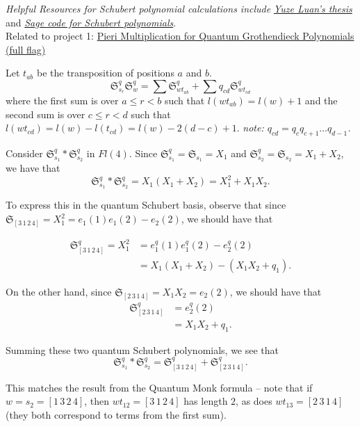 \textit{Helpful Resources for Schubert polynomial calculations include}
\href{https://www.math.ucdavis.edu/~webfiles/undergrad_thesis/202003_Yuze_Luan_Carlsson_Thesis.pdf}{\textit{Yuze Luan's thesis}} and \href{https://doc.sagemath.org/html/en/reference/combinat/sage/combinat/schubert_polynomial.html}{\textit{Sage code for Schubert polynomials}}. \\

Related to project 1: \href{https://arxiv.org/pdf/2211.01578}{Pieri Multiplication for Quantum Grothendieck Polynomials (full flag)} \\

\begin{theorem*}
Let $t_{ab}$ be the transposition of positions $a$ and $b$.
    \[
        \mathfrak{S}_{s_r}^q \mathfrak{S}_{w}^q = \sum \mathfrak{S}_{wt_{ab}}^q + \sum q_{cd}\mathfrak{S}_{wt_{cd}}^q
    \]
    where the first sum is over $a \leq r < b$ such that $l(wt_{ab}) = l(w) + 1$ and the second sum is over $c \leq r < d$ such that $l(wt_{cd}) = l(w) - l(t_{cd}) = l(w) - 2(d - c) + 1$. \textit{note: $q_{cd} = q_c q_{c+1} \dots q_{d-1}$.}
\end{theorem*}


\begin{eg}
Consider $\mathfrak{S}^q_{s_1} \ast \mathfrak{S}^q_{s_2}$ in $Fl(4)$. Since $\mathfrak{S}^q_{s_1} = \mathfrak{S}_{s_1} = X_1$ and $\mathfrak{S}^q_{s_2} = \mathfrak{S}_{s_2} = X_1 + X_2$, we have that
\[
    \mathfrak{S}^q_{s_1} \ast \mathfrak{S}^q_{s_2} = X_1(X_1 + X_2) = X_1^2 + X_1X_2.
\]

To express this in the quantum Schubert basis, observe that since $\mathfrak{S}_{[3\,1\,2\,4]} = X_1^2 = e_1(1)e_1(2) - e_2(2)$, we should have that

\begin{align*}
\mathfrak{S}^q_{[3\,1\,2\,4]} = X_1^2 &= e^q_1(1)e^q_1(2) - e^q_2(2) \\
&= X_1(X_1 + X_2) - (X_1X_2 + q_1).
\end{align*}

On the other hand, since $\mathfrak{S}_{[2\,3\,1\,4]} = X_1X_2 = e_2(2)$, we should have that
\begin{align*}
    \mathfrak{S}^q_{[2\,3\,1\,4]} &= e^q_2(2) \\
    &= X_1X_2 + q_1.
\end{align*}

Summing these two quantum Schubert polynomials, we see that
\[
    \boxed{\mathfrak{S}^q_{s_1} \ast \mathfrak{S}^q_{s_2} = \mathfrak{S}^q_{[3\,1\,2\,4]} + \mathfrak{S}^q_{[2\,3\,1\,4]}}.
\]

This matches the result from the Quantum Monk formula -- note that if $w = s_2 = [1\,3\,2\,4]$, then $wt_{12} = [3\,1\,2\,4]$ has length $2$, as does $wt_{13} = [2\,3\,1\,4]$ (they both correspond to terms from the first sum).
\end{eg}


